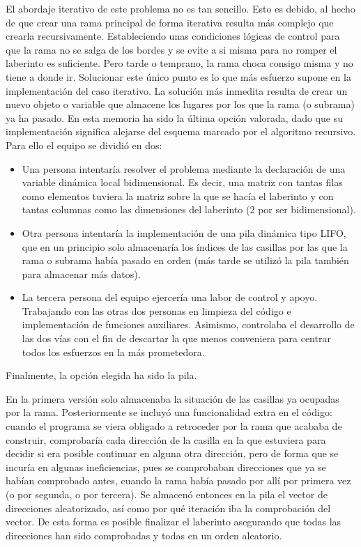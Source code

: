 \documentclass[12pt,a4paper]{article}
\begin{document}
El abordaje iterativo de este problema no es tan sencillo. Esto es debido, al hecho de que crear una rama principal de forma iterativa resulta más complejo que crearla recursivamente. Estableciendo unas condiciones lógicas de control para que la rama no se salga de los bordes y se evite a si misma para no romper el laberinto es suficiente. Pero tarde o temprano, la rama choca consigo misma y no tiene a donde ir. Solucionar este único punto es lo que más esfuerzo supone en la implementación del caso iterativo. La solución más inmedita resulta de crear un nuevo objeto o variable que almacene los lugares por los que la rama (o subrama) ya ha pasado. En esta memoria ha sido la última opción valorada, dado que su implementación significa alejarse del esquema marcado por el algoritmo recursivo. Para ello el equipo se dividió en dos: 
\begin{itemize}
	\item Una persona intentaría resolver el problema mediante la declaración de una variable dinámica local bidimensional. Es decir, una matriz con tantas filas como elementos tuviera la matriz sobre la que se hacía el laberinto y con tantas columnas como las dimensiones del laberinto (2 por ser bidimensional). 
	\item Otra persona intentaría la implementación de una pila dinámica tipo LIFO, que en un principio solo almacenaría los índices de las casillas por las que la rama o subrama había pasado en orden (más tarde se utilizó la pila también para almacenar más datos). 
	\item La tercera persona del equipo ejercería una labor de control y apoyo. Trabajando con las otras dos personas en limpieza del código e implementación de funciones auxiliares. Asimismo, controlaba el desarrollo de las dos vías con el fin de descartar la que menos conveniera para centrar todos los esfuerzos en la más prometedora.
\end{itemize}

Finalmente, la opción elegida ha sido la pila.  

En la primera versión solo almacenaba la situación de las casillas ya ocupadas por la rama. Posteriormente se incluyó una funcionalidad extra en el código: cuando el programa se viera obligado a retroceder por la rama que acababa de construir, comprobaría cada dirección de la casilla en la que estuviera para decidir si era posible continuar en alguna otra dirección, pero de forma que se incuría en algunas ineficiencias, pues se comprobaban direcciones que ya se habían comprobado antes, cuando la rama había pasado por allí por primera vez (o por segunda, o por tercera). Se almacenó entonces en la pila el vector de direcciones aleatorizado, así como por qué iteración iba la comprobación del vector. De esta forma es posible finalizar el laberinto asegurando que todas las direcciones han sido comprobadas y todas en un orden aleatorio.
\end{document}
